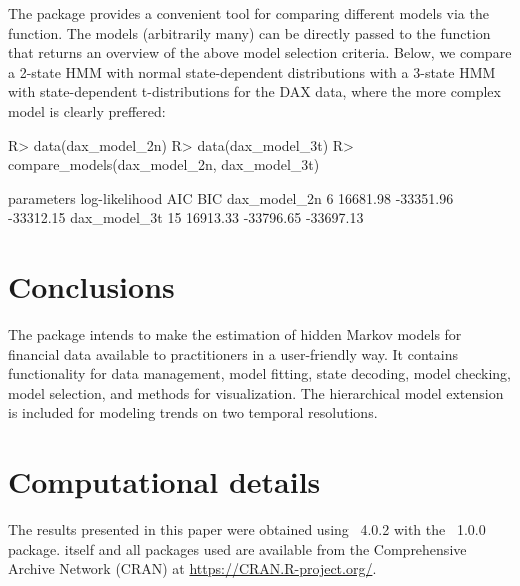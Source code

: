 \documentclass[article]{jss}
\newcommand{\fct}[1]{\code{#1()}}
\begin{document}
The  package provides a convenient tool for comparing different models via the \fct{compare\_models} function. The models (arbitrarily many) can be directly passed to the \fct{compare\_models} function that returns an overview of the above model selection criteria. Below, we compare a 2-state HMM with normal state-dependent distributions with a 3-state HMM with state-dependent t-distributions for the DAX data, where the more complex model is clearly preffered:

%
\begin{Schunk}
\begin{Sinput}
R> data(dax_model_2n)
R> data(dax_model_3t)
R> compare_models(dax_model_2n, dax_model_3t)
\end{Sinput}
\begin{Soutput}
             parameters log-likelihood       AIC       BIC
dax_model_2n          6       16681.98 -33351.96 -33312.15
dax_model_3t         15       16913.33 -33796.65 -33697.13
\end{Soutput}
\end{Schunk}
%



\section{Conclusions} \label{sec:conclusion} %

The  package intends to make the estimation of hidden Markov models for financial data available to practitioners in a user-friendly way. It contains functionality for data management, model fitting, state decoding, model checking, model selection, and methods for visualization. The hierarchical model extension is included for modeling trends on two temporal resolutions. 



\section*{Computational details}

The results presented in this paper were obtained using
~4.0.2 with the
~1.0.0 package.  itself
and all packages used are available from the Comprehensive
 Archive Network (CRAN) at \url{https://CRAN.R-project.org/}.
\end{document}

